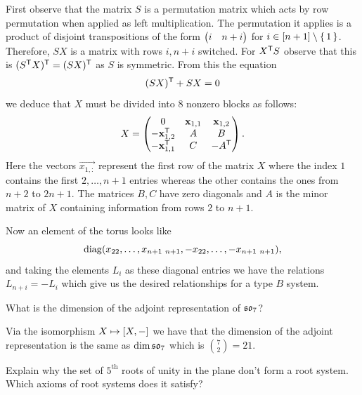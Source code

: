 \documentclass[12pt]{memoir}
\begin{document}
\begin{ptcbr}
    First observe that the matrix $S$ is a permutation matrix which acts by row permutation when applied as left multiplication. The permutation it applies is a product of disjoint transpositions of the form $\begin{pmatrix} i & n+i \end{pmatrix}$ for $i\in[n+1]\setminus\{\,1\,\}$. Therefore, $SX$ is a matrix with rows $i,n+i$ switched. For $X^{\mathsf{T}}S$ observe that this is $(S^{\mathsf{T}}X)^{\mathsf{T}}=(SX)^{\mathsf{T}}$ as $S$ is symmetric. From this the equation 
    $$(SX)^{\mathsf{T}}+SX=0$$
    we deduce that $X$ must be divided into 8 nonzero blocks as follows:
    $$X=\begin{pmatrix} 0 & \mathbf{x}_{1,1} & \mathbf{x}_{1,2} \\ -\mathbf{x}_{1,2}^{\mathsf{T}} & A & B \\ -\mathbf{x}_{1,1}^{\mathsf{T}} & C & -A^{\mathsf{T}} \end{pmatrix}.$$
    Here the vectors $\vec{x_{1,:}}$ represent the first row of the matrix $X$ where the index $1$ contains the first $2,\dots,n+1$ entries whereas the other contains the ones from $n+2$ to $2n+1$. The matrices $B,C$ have zero diagonals and $A$ is the minor matrix of $X$ containing information from rows $2$ to $n+1$.\par
    Now an element of the torus looks like 
    $$\diag(x_{22},\dots,x_{n+1\ n+1},-x_{22},\dots,-x_{n+1\ n+1}),$$
    and taking the elements $L_i$ as these diagonal entries we have the relations $L_{n+i}=-L_i$ which give us the desired relationships for a type $B$ system.
\end{ptcbr}

\begin{Ej}
    What is the dimension of the adjoint representation of $\mathfrak{so}_7$?
\end{Ej}


\begin{ptcbr}
    Via the isomorphism $X\mapsto\left\lbrack X,-\right\rbrack$ we have that the dimension of the adjoint representation is the same as $\dim\mathfrak{so}_7$ which is $\binom{7}{2}=21$.
\end{ptcbr}

\begin{Ej}
    Explain why the set of $5^{\text{th}}$ roots of unity in the plane don't form a root system. Which axioms of root systems does it satisfy?
\end{Ej}
\end{document}
